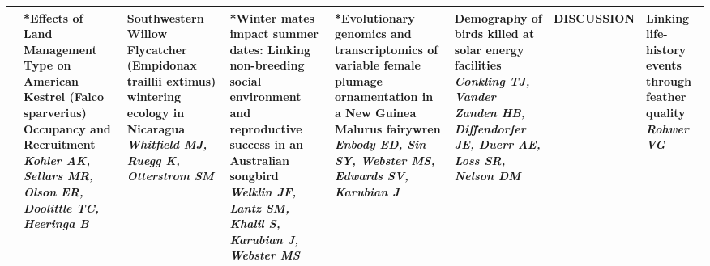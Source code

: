 \begin{tabular}{|x{0.85cm}|a{2.85cm}|x{2.85cm}|x{2.85cm}|x{2.85cm}|a{2.85cm}|a{2.85cm}|a{2.85cm}|}
\hline
{}&*Effects of Land Management Type on American Kestrel (Falco sparverius) Occupancy and Recruitment \newline \newline \textit{Kohler AK, Sellars MR, Olson ER, Doolittle TC, Heeringa B} & Southwestern Willow Flycatcher (Empidonax traillii extimus) wintering ecology in Nicaragua \newline \newline \textit{Whitfield MJ, Ruegg K, Otterstrom SM} & *Winter mates impact summer dates: Linking non-breeding social environment and reproductive success in an Australian songbird \newline \newline \textit{Welklin JF, Lantz SM, Khalil S, Karubian J, Webster MS} & *Evolutionary genomics and transcriptomics of variable female plumage ornamentation in a New Guinea Malurus fairywren \newline \newline \textit{Enbody ED, Sin SY, Webster MS, Edwards SV, Karubian J} & Demography of birds killed at solar energy facilities \newline \newline \textit{Conkling TJ, Vander Zanden HB, Diffendorfer JE, Duerr AE, Loss SR, Nelson DM} & DISCUSSION \newline \newline \textit{} & Linking life-history events through feather quality \newline \newline \textit{Rohwer VG}\\
\hline

\end{tabular}
